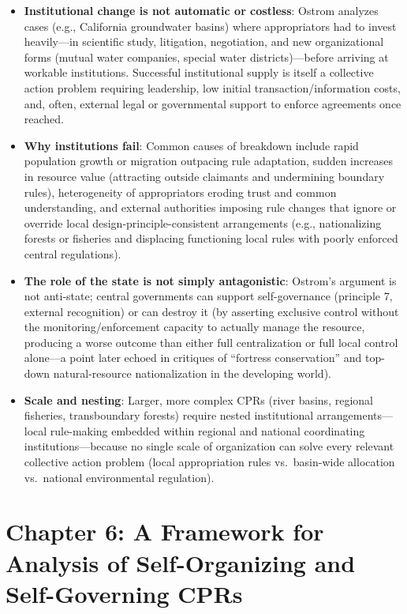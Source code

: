 \documentclass[12pt]{article}
\begin{document}
\begin{itemize}[leftmargin=*, itemsep=4pt]
    \item \textbf{Institutional change is not automatic or costless}: Ostrom analyzes cases (e.g., California groundwater basins) where appropriators had to invest heavily---in scientific study, litigation, negotiation, and new organizational forms (mutual water companies, special water districts)---before arriving at workable institutions. Successful institutional supply is itself a collective action problem requiring leadership, low initial transaction/information costs, and, often, external legal or governmental support to enforce agreements once reached.
    \item \textbf{Why institutions fail}: Common causes of breakdown include rapid population growth or migration outpacing rule adaptation, sudden increases in resource value (attracting outside claimants and undermining boundary rules), heterogeneity of appropriators eroding trust and common understanding, and external authorities imposing rule changes that ignore or override local design-principle-consistent arrangements (e.g., nationalizing forests or fisheries and displacing functioning local rules with poorly enforced central regulations).
    \item \textbf{The role of the state is not simply antagonistic}: Ostrom's argument is not anti-state; central governments can support self-governance (principle 7, external recognition) or can destroy it (by asserting exclusive control without the monitoring/enforcement capacity to actually manage the resource, producing a worse outcome than either full centralization or full local control alone---a point later echoed in critiques of ``fortress conservation'' and top-down natural-resource nationalization in the developing world).
    \item \textbf{Scale and nesting}: Larger, more complex CPRs (river basins, regional fisheries, transboundary forests) require nested institutional arrangements---local rule-making embedded within regional and national coordinating institutions---because no single scale of organization can solve every relevant collective action problem (local appropriation rules vs.\ basin-wide allocation vs.\ national environmental regulation).
\end{itemize}

\section{Chapter 6: A Framework for Analysis of Self-Organizing and Self-Governing CPRs}
\end{document}
